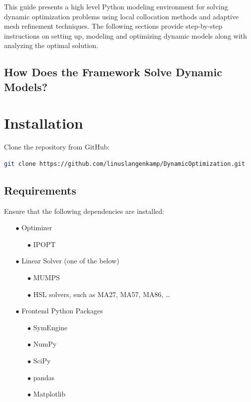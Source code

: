 \documentclass[12pt]{article}
\begin{document}
	This guide presents a high level Python modeling environment for solving dynamic optimization problems using local collocation methods and adaptive mesh refinement techniques. The following sections provide step-by-step instructions on setting up, modeling and optimizing dynamic models along with analyzing the optimal solution.
	
	\subsection{How Does the Framework Solve Dynamic Models?}
	\label{c:collocation}
	
	\section{Installation}
	Clone the repository from GitHub:
	
	\begin{lstlisting}[language=bash]
git clone https://github.com/linuslangenkamp/DynamicOptimization.git
	\end{lstlisting}
	
	\subsection{Requirements}
	Ensure that the following dependencies are installed:
	\begin{itemize}
		
	\item[$\bullet$] Optimizer
	
		\begin{itemize}
			\item[$\bullet$] IPOPT
		\end{itemize}
	
	\item[$\bullet$] Linear Solver (one of the below)
	
		\begin{itemize}
			\item[$\bullet$] MUMPS
			\item[$\bullet$] HSL solvers, such as MA27, MA57, MA86, \ldots
		\end{itemize}

	\item[$\bullet$] Frontend Python Packages
	
		\begin{itemize}
			\item[$\bullet$] SymEngine
			\item[$\bullet$] NumPy
			\item[$\bullet$] SciPy
			\item[$\bullet$] pandas
			\item[$\bullet$] Matplotlib
		\end{itemize}
	\end{itemize}
\end{document}
